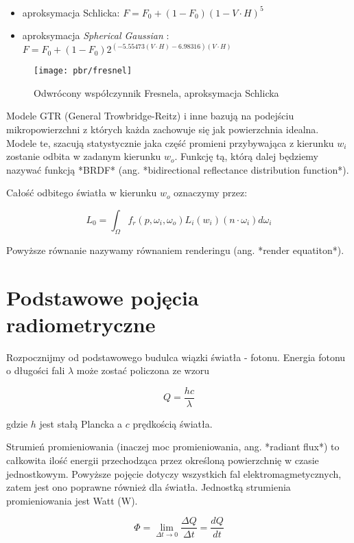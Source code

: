 \documentclass[../main.tex]{subfiles}
\begin{document}
\begin{itemize}
\item aproksymacja Schlicka: $F = F_0 + (1 - F_0)(1-V \cdot H)^5$
\item aproksymacja \textit{Spherical Gaussian} \cite{SphericalGaussianLegarde}:
	$ F = F_0 +(1−F_0) 2^{
		\left(−5.55473\left(V \cdot H\right)−6.98316\right) (V \cdot H)
	} $
\end{itemize}

\begin{figure}[ht]
	\centering
  \texttt{[image: pbr/fresnel]}
	\caption{Odwrócony współczynnik Fresnela, aproksymacja Schlicka}
\end{figure}

Modele GTR (General Trowbridge-Reitz) i inne bazują na podejściu
mikropowierzchni z których każda zachowuje się jak powierzchnia idealna. Modele
te, szacują statystycznie jaka część promieni przybywająca z kierunku $w_i$
zostanie odbita w zadanym kierunku $w_o$. Funkcję tą, którą dalej będziemy
nazywać funkcją *BRDF* (ang. *bidirectional reflectance distribution
function*).

Całość odbitego światła w kierunku $w_o$ oznaczymy przez:

$$
L_0 = \int_{\Omega} {
    f_r(p, \omega_i, \omega_o)
    L_i(w_i)
    (n \cdot \omega_i)
    d \omega_i
}
$$

Powyższe równanie nazywamy równaniem renderingu (ang. *render equatiton*).

\section{Podstawowe pojęcia radiometryczne}

Rozpocznijmy od podstawowego budulca wiązki światła - fotonu. Energia fotonu
o długości fali $\lambda$ może zostać policzona ze wzoru

$$ Q = \frac{hc}{\lambda} $$

gdzie $h$ jest stałą Plancka a $c$ prędkością światła.

Strumień promieniowania (inaczej moc promieniowania, ang. *radiant flux*) to
całkowita ilość energii przechodząca przez określoną powierzchnię w czasie
jednostkowym. Powyższe pojęcie dotyczy wszystkich fal elektromagmetycznych,
zatem jest ono poprawne również dla światła. Jednostką strumienia
promieniowania jest Watt ($\text{W}$).

$$
\Phi = \lim_{\Delta t \rightarrow 0}{
    \frac{\Delta Q}{\Delta t}=\frac{dQ}{dt}
}
$$
\end{document}
